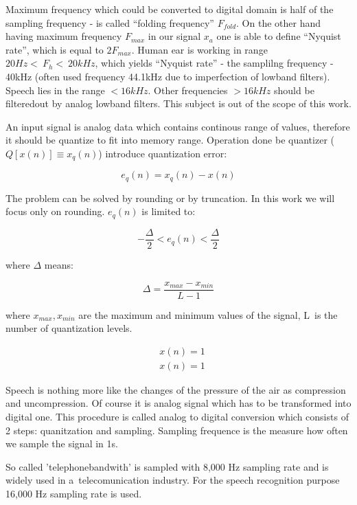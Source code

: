 \documentclass[a4paper]{report}
\theoremstyle{definition}
\begin{document}
Maximum frequency which could be converted to digital domain is half of the sampling frequency - is called ``folding frequency'' $F_{fold}$. On the other hand having maximum frequency $F_{max}$ in our signal $x_a$ one is able to define ``Nyquist rate'', which is equal to $2 F_{max}$. Human ear is working in range $20 Hz <~F_h <~20kHz$, which yields ``Nyquist rate'' - the samplilng frequency - 40kHz (often used frequency 44.1kHz due to imperfection of low\dywiz band filters). Speech lies in the range $< 16kHz$. Other frequencies $> 16kHz$ should be filtered\dywiz out by analog low\dywiz band filters. This subject is out of the scope of this work. 

An input signal is analog data which contains continous range of values, therefore it should be quantize to fit into memory range. Operation done be quantizer ($Q[x(n)] \equiv x_q(n)$) introduce quantization error:

\begin{equation}
e_q(n) = x_q(n) - x(n)
\end{equation}

The problem can be solved by rounding or by truncation. In this work we will focus only on rounding. $e_q(n)$ is limited to:


\begin{equation}
	-\frac{\Delta}{2} < e_q(n) < \frac{\Delta}{2}
\end{equation}

where $\Delta$ means:

\begin{equation}
	\Delta = \frac{x_{max}-x_{min}}{L-1}
\end{equation}

where $x_{max}, x_{min}$ are the maximum and minimum values of the signal, L~is the number of quantization levels.


\begin{align}
	& x(n) = 1 \\
	& x(n) = 1 
\end{align}

Speech is nothing more like the changes of the pressure of the air as compression and uncompression. Of course it is analog signal which has to be transformed into digital one. This procedure is called analog to digital conversion which consists of 2 steps: quanitzation and sampling. Sampling frequence is the measure how often we sample the signal in 1s. 


So called 'telephone\dywiz bandwith' is sampled with 8,000 Hz sampling rate and is widely used in a~telecomunication industry. For the speech recognition purpose 16,000 Hz sampling rate is used.  
\end{document}
